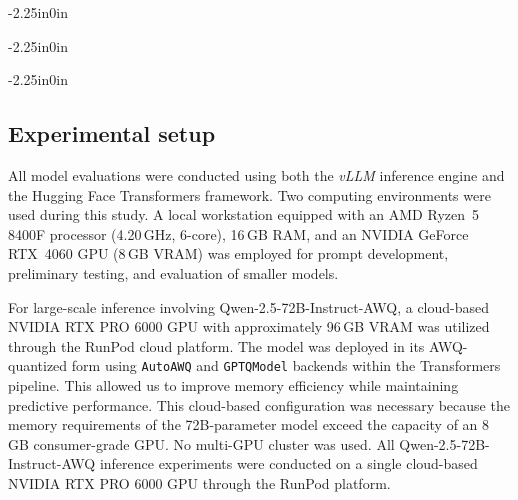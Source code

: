 \documentclass[10pt,letterpaper]{article}
\begin{document}
\begin{adjustwidth}{-2.25in}{0in}
\begin{minipage}{0.95\linewidth}
\centering
\label{fig:emo_few_prompt}
\end{minipage}
\end{adjustwidth}

\begin{adjustwidth}{-2.25in}{0in}
\begin{minipage}{0.95\linewidth}
\centering
\label{fig:hate_few_prompt}
\end{minipage}
\end{adjustwidth}

\begin{adjustwidth}{-2.25in}{0in}
\begin{minipage}{0.95\linewidth}
\centering
\label{fig:fake_few_prompt}
\end{minipage}
\end{adjustwidth}

\subsection*{Experimental setup}
\label{sec:experiment}



All model evaluations were conducted using both the \textit{vLLM} inference engine and the Hugging Face Transformers framework. Two computing environments were used during this study. A local workstation equipped with an AMD Ryzen~5 8400F processor (4.20\,GHz, 6-core), 16\,GB RAM, and an NVIDIA GeForce RTX~4060 GPU (8\,GB VRAM) was employed for prompt development, preliminary testing, and evaluation of smaller models.



For large-scale inference involving Qwen-2.5-72B-Instruct-AWQ, a cloud-based NVIDIA RTX PRO 6000 GPU with approximately 96\,GB VRAM was utilized through the RunPod cloud platform. The model was deployed in its AWQ-quantized form using \texttt{AutoAWQ} and \texttt{GPTQModel} backends within the Transformers pipeline. This allowed us to improve memory efficiency while maintaining predictive performance. This cloud-based configuration was necessary because the memory requirements of the 72B-parameter model exceed the capacity of an 8\,GB consumer-grade GPU. No multi-GPU cluster was used. All Qwen-2.5-72B-Instruct-AWQ inference experiments were conducted on a single cloud-based NVIDIA RTX PRO 6000 GPU through the RunPod platform.
\end{document}
